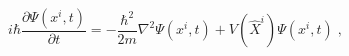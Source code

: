 \begin{equation}
i\hbar\frac{\partial\Psi(x^{i},t)}{\partial t}=-\frac{\hbar^{2}}{2m}\nabla
^{2}\Psi(x^{i},t)+V(\widehat{X}^{i})\Psi(x^{i},t)\;,\label{29}%
\end{equation}

